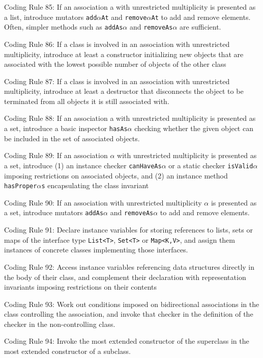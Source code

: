 \documentclass{article}
\begin{document}
\par Coding Rule 85: If an association a with unrestricted multiplicity is presented as a list, introduce mutators \texttt{add}$\alpha$\texttt{At} and \texttt{remove}$\alpha$\texttt{At} to add and remove elements. Often,  simpler methods such as \texttt{addAs}$\alpha$ and \texttt{removeAs}$\alpha$ are sufficient.
\par Coding Rule 86: If a class is involved in an association with unrestricted multiplicity, introduce at least a constructor initializing new objects that are associated with the lowest possible number of objects of the other class 
\par Coding Rule 87: If a class is involved in an association with unrestricted multiplicity, introduce at least a destructor that disconnects the object to be terminated from all  objects it is still associated with.
\par Coding Rule 88: If an association a with unrestricted multiplicity is presented as a set, introduce a basic inspector \texttt{hasAs}$\alpha$ checking whether the given object can be included in the set of associated objects.
\par Coding Rule 89: If an association $\alpha$ with unrestricted multiplicity is presented as a set, introduce (1) an instance checker \texttt{canHaveAs}$\alpha$ or a static checker \texttt{isValid}$\alpha$ imposing restrictions on associated objects, and (2) an instance method  \texttt{hasProper}$\alpha$\texttt{s} encapsulating the class invariant
\par Coding Rule 90: If an association with unrestricted multiplicity $\alpha$ is presented as a set, introduce mutators \texttt{addAs}$\alpha$ and \texttt{removeAs}$\alpha$ to add and remove elements.
\par Coding Rule 91: Declare instance variables for storing references to lists, sets or maps of the interface type \texttt{List<T>}, \texttt{Set<T>} or \texttt{Map<K,V>}, and assign them instances of  concrete classes implementing those interfaces.
\par Coding Rule 92: Access instance variables referencing data structures directly in the body  of their class, and complement their declaration with representation invariants imposing restrictions on their contents
\par Coding Rule 93: Work out conditions imposed on bidirectional associations in the class controlling the association, and invoke that checker in the definition of the checker in the  non-controlling class.
\par Coding Rule 94: Invoke the most extended constructor of the superclass in the most extended constructor of a subclass.
\end{document}
